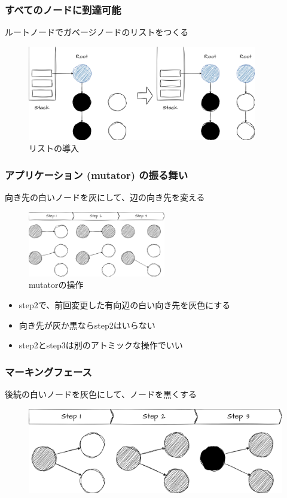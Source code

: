 \documentclass[unicode, 14pt, aspectratio=169]{beamer}
\begin{document}
\begin{frame}
  \frametitle{すべてのノードに到達可能}
  {\large ルートノードでガベージノードのリストをつくる}
  \begin{figure}[h]
    \includegraphics[width=10cm]{./img/freelist.png}
    \caption{リストの導入}
    \label{fig:freelist}
  \end{figure}
\end{frame}
\begin{frame}
  \frametitle{アプリケーション (mutator) の振る舞い}
  {\large 向き先の白いノードを灰にして、辺の向き先を変える}
  \begin{figure}[h]
    \includegraphics[width=6cm]{./img/mutator.png}
    \caption{mutatorの操作}
    \label{fig:mutator}
  \end{figure}
  \vspace{-1cm}
  \begin{itemize}
  \item step2で、前回変更した有向辺の白い向き先を灰色にする
  \item 向き先が灰か黒ならstep2はいらない
  \item step2とstep3は別のアトミックな操作でいい
  \end{itemize}
\end{frame}
\begin{frame}
  \frametitle{マーキングフェース}
  {\large 後続の白いノードを灰色にして、ノードを黒くする}
  \begin{figure}[h]
    \includegraphics[width=12cm]{./img/marking.png}
    \label{fig:marking}
  \end{figure}
\end{frame}
\end{document}
